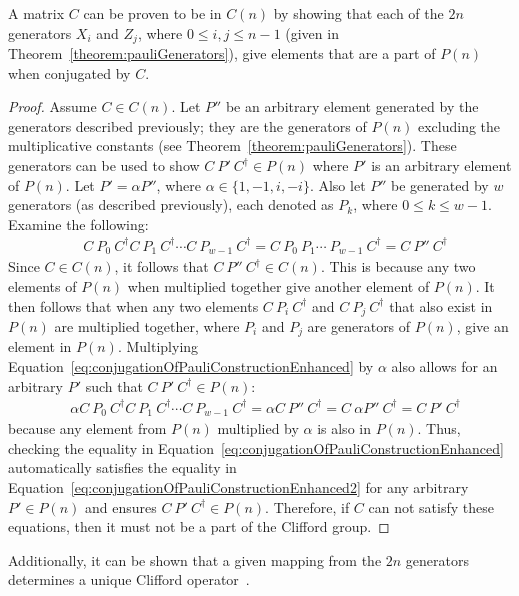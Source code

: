 \begin{theorem}
\label{theorem:proofForProvingGateIsClifford}
A matrix $C$ can be proven to be in $C(n)$ by showing that each of the $2n$ generators $X_i$ and $Z_j$, where $0 \leq i, j \leq n-1$ (given in Theorem~\ref{theorem:pauliGenerators}), give elements that are a part of $P(n)$ when conjugated by $C$. 
\end{theorem}
\begin{proof}
Assume $C \in C(n)$. Let $P''$ be an arbitrary element generated by the generators described previously; they are the generators of $P(n)$ excluding the multiplicative constants (see Theorem~\ref{theorem:pauliGenerators}). These generators can be used to show $C \ P' \ C^{\dagger} \in P(n)$ where $P'$ is an arbitrary element of $P(n)$. Let $P' = \alpha P''$, where $\alpha \in \{1, -1, i, -i\}$. Also let $P''$ be generated by $w$ generators (as described previously), each denoted as $P_k$, where $0 \leq k \leq w - 1$. Examine the following:
\begin{align}
\label{eq:conjugationOfPauliConstructionEnhanced}
&C \ P_0 \ C^{\dagger}C \ P_1 \ C^{\dagger}\cdots C \ P_{w-1} \ C^{\dagger} = C \ P_0 \ P_1 \cdots \ P_{w-1} \ C^{\dagger} = C \ P'' \ C^{\dagger}
\end{align}
Since $C \in C(n)$, it follows that $C \ P'' \ C^{\dagger} \in C(n)$. This is because any two elements of $P(n)$ when multiplied together give another element of $P(n)$. It then follows that when any two elements $C \ P_i \ C^{\dagger}$ and $C \ P_j \ C^{\dagger}$ that also exist in $P(n)$ are multiplied together, where $P_i$ and $P_j$ are generators of $P(n)$, give an element in $P(n)$. Multiplying Equation~\eqref{eq:conjugationOfPauliConstructionEnhanced} by $\alpha$ also allows for an arbitrary $P'$ such that $C \ P' \ C^{\dagger} \in P(n)$:
\begin{align}
\label{eq:conjugationOfPauliConstructionEnhanced2}
&\alpha C \ P_0 \ C^{\dagger}C \ P_1 \ C^{\dagger}\cdots C \ P_{w-1} \ C^{\dagger} = \alpha C \ P'' \ C^{\dagger} = C \ \alpha P'' \ C^{\dagger} = C \ P' \ C^{\dagger}
\end{align}
because any element from $P(n)$ multiplied by $\alpha$ is also in $P(n)$. Thus, checking the equality in Equation~\eqref{eq:conjugationOfPauliConstructionEnhanced} automatically satisfies the equality in Equation~\eqref{eq:conjugationOfPauliConstructionEnhanced2} for any arbitrary $P' \in P(n)$ and ensures $C \ P' \ C^{\dagger} \in P(n)$. Therefore, if $C$ can not satisfy these equations, then it must not be a part of the Clifford group.
\end{proof}
Additionally, it can be shown that a given mapping from the $2n$ generators determines a unique Clifford operator~\cite{ozols2008clifford}.

